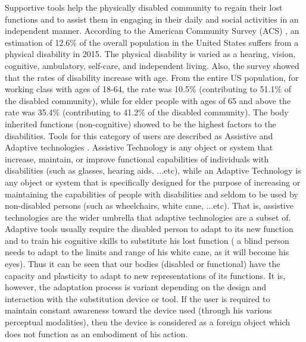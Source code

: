 Supportive tools help the physically disabled community to regain their lost functions and to assist them in engaging in their daily and social activities in an independent manner. According to the American Community Survey (ACS) \cite{disabilities2016}, an estimation of 12.6\% of the overall population in the United States suffers from a physical disability in 2015. The physical disability is varied as a hearing, vision, cognitive, ambulatory, self-care, and independent living. Also, the survey showed that the rates of disability increase with age. From the entire US population, for working class with ages of 18-64, the rate was 10.5\% (contributing to 51.1\% of the disabled community), while for elder people with ages of 65 and above the rate was 35.4\% (contributing to 41.2\% of the disabled community). The body inherited functions (non-cognitive) showed to be the highest factors to the disabilities. Tools for this category of users are described as Assistive and Adaptive technologies \cite{Tennessee2012standards}. Assistive Technology is any object or system that increase, maintain, or improve functional capabilities of individuals with disabilities (such as glasses, hearing aids, ...etc), while an Adaptive Technology is any object or system that is specifically designed for the purpose of increasing or maintaining the capabilities of people with disabilities and seldom to be used by non-disabled persons (such as wheelchairs, white cane, ...etc). That is, assistive technologies are the wider umbrella that adaptive technologies are a subset of. Adaptive tools usually require the disabled person to adapt to its new function and to train his cognitive skills to substitute his lost function ( a blind person needs to adapt to the limits and range of his white cane, as it will become his eyes). Thus it can be seen that our bodies (disabled or functional) have the capacity and plasticity to adapt to new representations of its functions. It is, however, the adaptation process is variant depending on the design and interaction with the substitution device or tool. If the user is required to maintain constant awareness toward the device used (through his various perceptual modalities), then the device is considered as a foreign object which does not function as an embodiment of his action.

